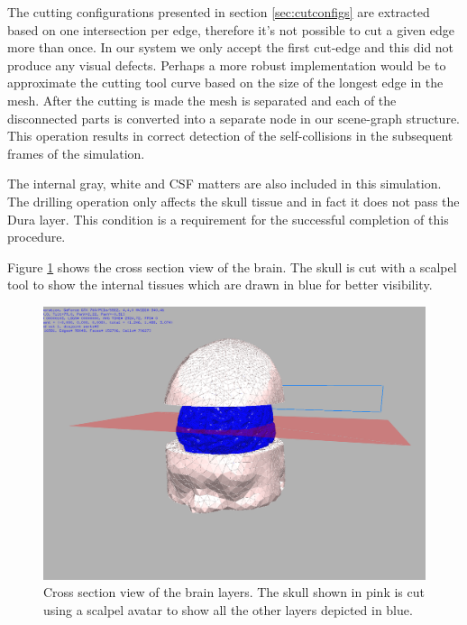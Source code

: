 The cutting configurations presented in section \ref{sec:cutconfigs} are extracted based on one intersection per edge, therefore
it's not possible to cut a given edge more than once. In our system we only accept the first cut-edge and this did not produce any 
visual defects. Perhaps a more robust implementation would be to approximate the cutting tool curve based on the size of the longest 
edge in the mesh. After the cutting is made the mesh is separated and each of the disconnected parts is converted into a separate node
in our scene-graph structure. This operation results in correct detection of the self-collisions in the subsequent frames of the simulation.

The internal gray, white and CSF matters are also included in this simulation. The drilling operation only affects the skull tissue and
in fact it does not pass the Dura layer. This condition is a requirement for the successful completion of this procedure. 

Figure \ref{fig:crosssection} shows the cross section view of the brain. The skull is cut with a scalpel tool 
to show the internal tissues which are drawn in blue for better visibility. 
\begin{figure}[H]
  \centering
  \includegraphics[width=0.5\linewidth]{figures/evaluation/crosssection.png}
  \caption{\label{fig:crosssection}
  {Cross section view of the brain layers. The skull shown in pink is cut using a scalpel avatar to show 
   all the other layers depicted in blue.}
}
\end{figure}

